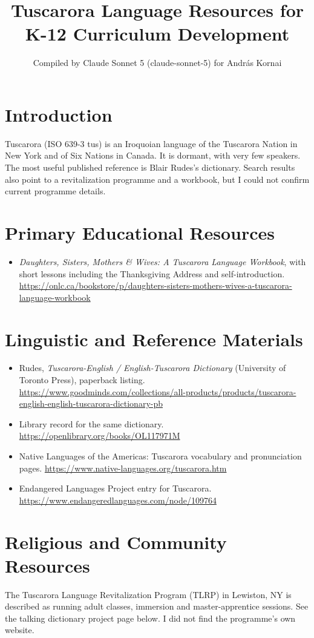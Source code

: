\documentclass[12pt]{article}
\title{Tuscarora Language Resources for K-12 Curriculum Development}
\author{Compiled by Claude Sonnet 5 (claude-sonnet-5) for Andr\'as Kornai}
\date{}
\begin{document}
\maketitle

\section{Introduction}
Tuscarora (ISO 639-3 tus) is an Iroquoian language of the Tuscarora Nation in New York and of Six Nations in Canada. It is dormant, with very few speakers. The most useful published reference is Blair Rudes's dictionary. Search results also point to a revitalization programme and a workbook, but I could not confirm current programme details.

\section{Primary Educational Resources}
\begin{itemize}
\item \emph{Daughters, Sisters, Mothers \& Wives: A Tuscarora Language Workbook}, with short lessons including the Thanksgiving Address and self-introduction. \url{https://onlc.ca/bookstore/p/daughters-sisters-mothers-wives-a-tuscarora-language-workbook}
\end{itemize}

\section{Linguistic and Reference Materials}
\begin{itemize}
\item Rudes, \emph{Tuscarora-English / English-Tuscarora Dictionary} (University of Toronto Press), paperback listing. \url{https://www.goodminds.com/collections/all-products/products/tuscarora-english-english-tuscarora-dictionary-pb}
\item Library record for the same dictionary. \url{https://openlibrary.org/books/OL117971M}
\item Native Languages of the Americas: Tuscarora vocabulary and pronunciation pages. \url{https://www.native-languages.org/tuscarora.htm}
\item Endangered Languages Project entry for Tuscarora. \url{https://www.endangeredlanguages.com/node/109764}
\end{itemize}

\section{Religious and Community Resources}
The Tuscarora Language Revitalization Program (TLRP) in Lewiston, NY is described as running adult classes, immersion and master-apprentice sessions. See the talking dictionary project page below. I did not find the programme's own website.
\end{document}
